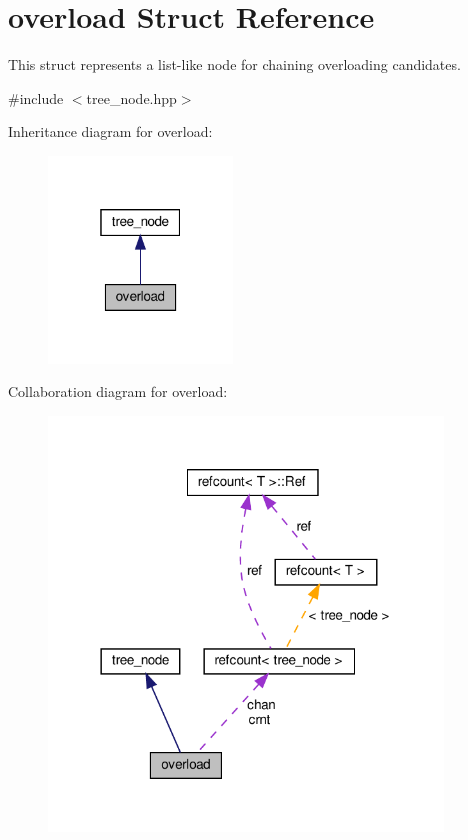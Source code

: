 \hypertarget{structoverload}{}\section{overload Struct Reference}
\label{structoverload}


This struct represents a list-\/like node for chaining overloading candidates.  




{\ttfamily \#include $<$tree\+\_\+node.\+hpp$>$}



Inheritance diagram for overload\+:
\nopagebreak
\begin{figure}[H]
\begin{center}
\leavevmode
\includegraphics[width=139pt]{d9/d93/structoverload__inherit__graph}
\end{center}
\end{figure}


Collaboration diagram for overload\+:
\nopagebreak
\begin{figure}[H]
\begin{center}
\leavevmode
\includegraphics[width=297pt]{d3/d51/structoverload__coll__graph}
\end{center}
\end{figure}
